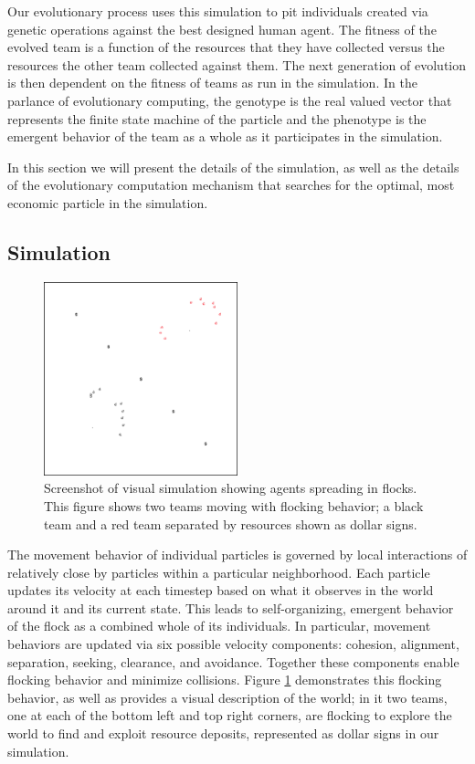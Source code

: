 \documentclass[conference,final]{IEEEtran}
\begin{document}
Our evolutionary process uses this simulation to pit individuals created via genetic operations against the best designed human agent. The fitness of the evolved team is a function of the resources that they have collected versus the resources the other team collected against them. The next generation of evolution is then dependent on the fitness of teams as run in the simulation. In the parlance of evolutionary computing, the genotype is the real valued vector that represents the finite state machine of the particle and the phenotype is the emergent behavior of the team as a whole as it participates in the simulation.

In this section we will present the details of the simulation, as well as the details of the evolutionary computation mechanism that searches for the optimal, most economic particle in the simulation.

\subsection{Simulation}

\begin{figure}[t!]
    \centering
        \includegraphics[width=0.5\textwidth]{figures/simulation}
    \caption{Screenshot of visual simulation showing agents spreading in flocks. This figure shows two teams moving with flocking behavior; a black team and a red team separated by resources shown as dollar signs.}
    \label{fig:simulation}
\end{figure}

The movement behavior of individual particles is governed by local interactions of relatively close by particles within a particular neighborhood. Each particle updates its velocity at each timestep based on what it observes in the world around it and its current state. This leads to self-organizing, emergent behavior of the flock as a combined whole of its individuals. In particular, movement behaviors are updated via six possible velocity components: cohesion, alignment, separation, seeking, clearance, and avoidance. Together these components enable flocking behavior and minimize collisions. Figure \ref{fig:simulation} demonstrates this flocking behavior, as well as provides a visual description of the world; in it two teams, one at each of the bottom left and top right corners, are flocking to explore the world to find and exploit resource deposits, represented as dollar signs in our simulation.
\end{document}

